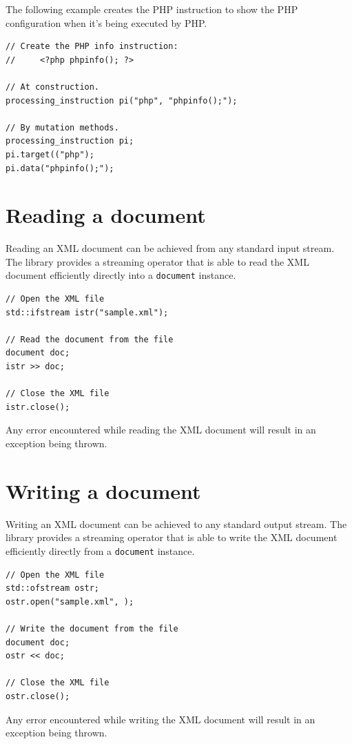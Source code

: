 \documentclass[10pt,a4paper,openany]{mudbook}
\begin{document}
The following example creates the PHP instruction to show the PHP configuration
when it's being executed by PHP.

\begin{lstlisting}[style=snippet]
// Create the PHP info instruction:
//     <?php phpinfo(); ?>  

// At construction.
processing_instruction pi("php", "phpinfo();");

// By mutation methods.
processing_instruction pi;
pi.target(("php");
pi.data("phpinfo();");
\end{lstlisting}

\section{Reading a document}

Reading an XML document can be achieved from any standard input stream. The
\MUDLib library provides a streaming operator that is able to read the XML
document efficiently directly into a \texttt{document} instance.

\begin{lstlisting}[style=snippet]
// Open the XML file
std::ifstream istr("sample.xml");

// Read the document from the file
document doc;
istr >> doc;

// Close the XML file
istr.close();
\end{lstlisting}

Any error encountered while reading the XML document will result in an
exception being thrown.

\section{Writing a document}

Writing an XML document can be achieved to any standard output stream. The
\MUDLib library provides a streaming operator that is able to write the XML
document efficiently directly from a \texttt{document} instance.

\begin{lstlisting}[style=snippet]
// Open the XML file
std::ofstream ostr;
ostr.open("sample.xml", );

// Write the document from the file
document doc;
ostr << doc;

// Close the XML file
ostr.close();
\end{lstlisting}

Any error encountered while writing the XML document will result in an
exception being thrown.
\end{document}

